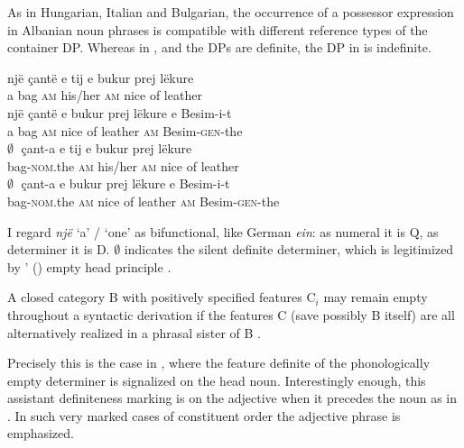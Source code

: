 \documentclass[output=paper,colorlinks,citecolor=brown]{langscibook}
\begin{document}
\noindent As in Hungarian, Italian and Bulgarian, the occurrence of a possessor expression in Albanian noun phrases is compatible with different reference types of the container DP. Whereas in ,  and  the DPs are definite, the DP in  is indefinite.

\ea \label{ex:zi91:48}
    \ea \label{ex:zi91:48a}
        \gll një çantë e tij e bukur prej lëkure \\
        a bag \textsc{am} his/her \textsc{am} nice of leather \\
        \glt 
    \ex \label{ex:zi91:48b}
        \gll një çantë e bukur prej lëkure e Besim-i-t \\
        a bag \textsc{am} nice of leather \textsc{am} Besim-\textsc{gen}-the \\
        \glt
    \z
\ex \label{ex:zi91:49}
    \ea \label{ex:zi91:49a}
        \gll $\emptyset \;$ çant-a e tij e bukur prej lëkure \\
        {} bag-\textsc{nom}.the \textsc{am} his/her \textsc{am} nice of leather \\
        \glt 
    \ex \label{ex:zi91:49b}
        \gll $\emptyset \;$ çant-a e bukur prej lëkure e Besim-i-t \\
        {} bag-\textsc{nom}.the \textsc{am} nice of leather \textsc{am} Besim-\textsc{gen}-the \\
        \glt
    \z
\z

\noindent I regard \textit{një} `a' / `one' as bifunctional, like German \textit{ein}: as numeral it is Q, as determiner it is D. $\emptyset$ indicates the silent definite determiner, which is legitimized by \citeauthor{Emonds85Unified-theory}' (\citeyear{Emonds85Unified-theory, Emonds87Invisible-category}) empty head principle .

\ea \label{ex:zi91:50} A closed category B with positively specified features C$_{i}$ may remain empty throughout a syntactic derivation if the features C (save possibly B itself) are all alternatively realized in a phrasal sister of B \citep[615]{Emonds87Invisible-category}.
\z

\noindent Precisely this is the case in , where the feature definite of the phonologically empty determiner is signalized on the head noun. Interestingly enough, this assistant definiteness marking is on the adjective when it precedes the noun as in . In such very marked cases of constituent order the adjective phrase is emphasized.
\end{document}
